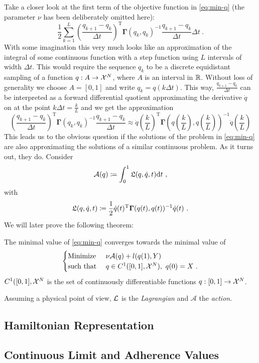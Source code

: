 Take a closer look at the first term of the objective function in \cref{eq:min-q} (the parameter $\nu$ has been deliberately omitted here):
\begin{equation}
	\label{eq:discrete-lagrangian}
	\frac{1}{2} \sum_{k=1}^{L} \left(\frac{q_{k+1} - q_k}{\Delta t}\right)^\mathrm{T} \mathbf{\Gamma}(q_k, q_k)^{-1} \frac{q_{k+1} - q_k}{\Delta t} \Delta t \ .
\end{equation}
With some imagination this very much looks like an approximation of the integral of some continuous function with a step function using $L$ intervals of width $\Delta t$.
This would require the sequence $q_k$ to be a discrete equidistant sampling of a function $q: A \rightarrow \mathcal{X}^N$, where $A$ is an interval in $\mathbb{R}$.
Without loss of generality we choose $A = [0, 1]$ and write $q_k = q(k \Delta t)$.
This way, $\frac{q_{k+1} - q_k}{\Delta t}$ can be interpreted as a forward differential quotient approximating the derivative $\dot{q}$ on at the point $k \Delta t = \frac{k}{L}$ and we get the approximation
\begin{equation}
	\left(\frac{q_{k+1} - q_k}{\Delta t}\right)^\mathrm{T} \mathbf{\Gamma}(q_k, q_k)^{-1} \frac{q_{k+1} - q_k}{\Delta t} 
	\approx \dot{q}\left(\frac{k}{L}\right)^\mathrm{T} \mathbf{\Gamma}\left(q\left(\frac{k}{L}\right), q\left(\frac{k}{L}\right)\right)^{-1}\dot{q}\left(\frac{k}{L}\right)
\end{equation}
This leads us to the obvious question if the solutions of the problem in \cref{eq:min-q} are also approximating the solutions of a similar continuous problem.
As it turns out, they do.
Consider 
\begin{equation}
	\mathcal{A}(q) \coloneqq \int_{0}^{1} \mathfrak{L}(q, \dot{q}, t) \mathrm{d}t \ ,
\end{equation}
with
\begin{equation}
	\fL(q, \dot{q}, t) \coloneqq \frac{1}{2} \dot{q}(t)^\mathrm{T} \mathbf{\Gamma}(q(t), q(t))^{-1} \dot{q}(t) \ .
\end{equation}
We will later prove the following theorem:
\begin{theorem}
	The minimal value of \cref{eq:min-q} converges towards the minimal value of             
	\begin{equation}
	\label{eq:cont-least-action}
		\begin{cases}
			\text{Minimize~} & \nu \mathcal{A}(q) + l(q(1), Y)\\
			\text{such that~} & q \in C^1([0,1], \cX^N),\ q(0) = X \ .
		\end{cases}
	\end{equation}
	$C^1([0,1], \mathcal{X}^N$ is the set of continuously differentiable functions $q: [0, 1] \rightarrow \mathcal{X}^N$.
\end{theorem}

Assuming a physical point of view, $\mathcal{L}$ is the \emph{Lagrangian} and $\mathcal{A}$ the \emph{action}.

\subsection{Hamiltonian Representation}

\subsection{Continuous Limit and Adherence Values}